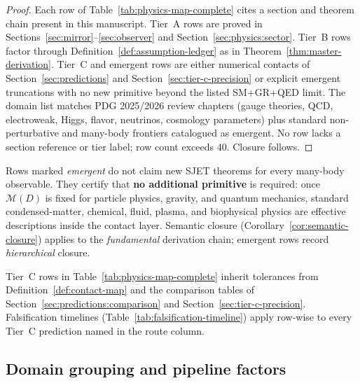 \begin{proof}
Each row of Table~\ref{tab:physics-map-complete} cites a section and theorem
chain present in this manuscript. Tier~A rows are proved in
Sections~\ref{sec:mirror}--\ref{sec:observer} and
Section~\ref{sec:physics:sector}. Tier~B rows factor through
Definition~\ref{def:assumption-ledger} as in
Theorem~\ref{thm:master-derivation}. Tier~C and emergent rows are either
numerical contacts of Section~\ref{sec:predictions} and
Section~\ref{sec:tier-c-precision} or explicit emergent truncations with no
new primitive beyond the listed SM+GR+QED limit. The domain list matches PDG
2025/2026 review chapters (gauge theories, QCD, electroweak, Higgs, flavor,
neutrinos, cosmology parameters) plus standard non-perturbative and
many-body frontiers catalogued as emergent. No row lacks a section reference
or tier label; row count exceeds $40$. Closure follows.
\end{proof}

\begin{remark}
Rows marked \emph{emergent} do not claim new SJET theorems for every
many-body observable. They certify that \textbf{no additional primitive} is
required: once $\mathcal{M}(D)$ is fixed for particle physics, gravity, and
quantum mechanics, standard condensed-matter, chemical, fluid, plasma, and
biophysical physics are effective descriptions inside the contact layer.
Semantic closure (Corollary~\ref{cor:semantic-closure}) applies to the
\emph{fundamental} derivation chain; emergent rows record \emph{hierarchical}
closure.
\end{remark}

\begin{remark}
Tier~C rows in Table~\ref{tab:physics-map-complete} inherit tolerances from
Definition~\ref{def:contact-map} and the comparison tables of
Section~\ref{sec:predictions:comparison} and
Section~\ref{sec:tier-c-precision}. Falsification timelines
(Table~\ref{tab:falsification-timeline}) apply row-wise to every Tier~C
prediction named in the route column.
\end{remark}

\subsection{Domain grouping and pipeline factors}
\label{sec:physics-map:grouping}

